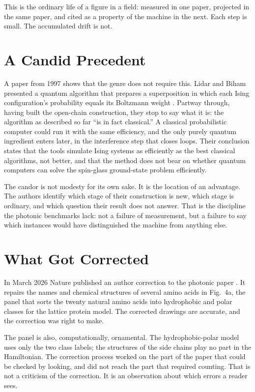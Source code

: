 \documentclass[11pt]{article}
\theoremstyle{definition}
\theoremstyle{remark}
\begin{document}
This is the ordinary life of a figure in a field: measured in one paper, projected in the same paper, and cited as a property of the machine in the next. Each step is small. The accumulated drift is not.

\section{A Candid Precedent}

A paper from 1997 shows that the genre does not require this. Lidar and Biham presented a quantum algorithm that prepares a superposition in which each Ising configuration's probability equals its Boltzmann weight \cite{lidar1997}. Partway through, having built the open-chain construction, they stop to say what it is: the algorithm as described so far ``is in fact classical.'' A classical probabilistic computer could run it with the same efficiency, and the only purely quantum ingredient enters later, in the interference step that closes loops. Their conclusion states that the tools simulate Ising systems as efficiently as the best classical algorithms, not better, and that the method does not bear on whether quantum computers can solve the spin-glass ground-state problem efficiently.

The candor is not modesty for its own sake. It is the location of an advantage. The authors identify which stage of their construction is new, which stage is ordinary, and which question their result does not answer. That is the discipline the photonic benchmarks lack: not a failure of measurement, but a failure to say which instances would have distinguished the machine from anything else.

\section{What Got Corrected}

In March 2026 Nature published an author correction to the photonic paper \cite{alkayed2026corr}. It repairs the names and chemical structures of several amino acids in Fig.~4a, the panel that sorts the twenty natural amino acids into hydrophobic and polar classes for the lattice protein model. The corrected drawings are accurate, and the correction was right to make.

The panel is also, computationally, ornamental. The hydrophobic-polar model uses only the two class labels; the structures of the side chains play no part in the Hamiltonian. The correction process worked on the part of the paper that could be checked by looking, and did not reach the part that required counting. That is not a criticism of the correction. It is an observation about which errors a reader sees.
\end{document}
